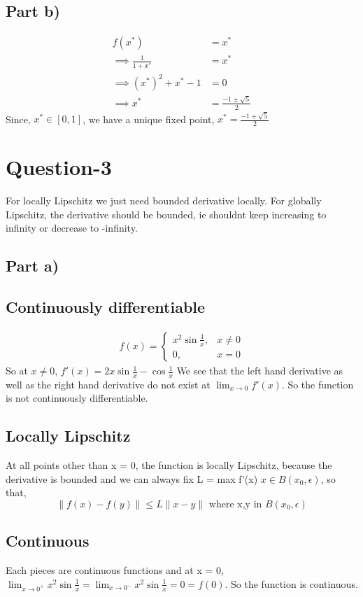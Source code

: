 \documentclass{article}
\begin{document}
\subsection*{Part b)}
\begin{align}
    f(x^*) &= x^* \\
    \implies \frac{1}{1 + x^*} &= x^* \\
    \implies (x^*)^2 + x^* - 1 &= 0 \\
     \implies x^* &= \frac{-1\pm\sqrt{5}}{2}
\end{align}
Since, $x^* \in [0,1]$, we have a unique fixed point, $x^* = \frac{-1+\sqrt{5}}{2}$


\section*{Question-3}
For locally Lipschitz we just need bounded derivative locally. For globally Lipschitz, the derivative should be bounded, ie shouldnt keep increasing to infinity or decrease to -infinity.
\subsection*{Part a)}
\subsection*{Continuously differentiable}
\begin{align}
    f(x)= 
\begin{cases}
    x^2\sin\frac{1}{x},& x\neq 0\\
    0,  & x=0
\end{cases}
\end{align}
So at $x\neq0$,
$f'(x) = 2x\sin\frac{1}{x} - \cos\frac{1}{x}$
We see that the left hand derivative as well as the right hand derivative do not exist at $\lim_{x\to0}f'(x)$. So the function is not continuously differentiable.
\subsection*{Locally Lipschitz}
At all points other than x = 0, the function is locally Lipschitz, because the derivative is bounded and we can always fix L = max f'(x) $x \in B(x_0, \epsilon)$, so that,
\begin{equation*}
    \|f(x) - f(y)\| \leq L\|x-y\| \textrm{ where x,y in } B(x_0, \epsilon)
\end{equation*}
 
\subsection*{Continuous}
Each pieces are continuous functions and at x = 0,
$\lim_{x\to0^+} x^2\sin\frac{1}{x} = \lim_{x\to0^-} x^2\sin\frac{1}{x} = 0 = f(0)$. So the function is continuous.
\end{document}

